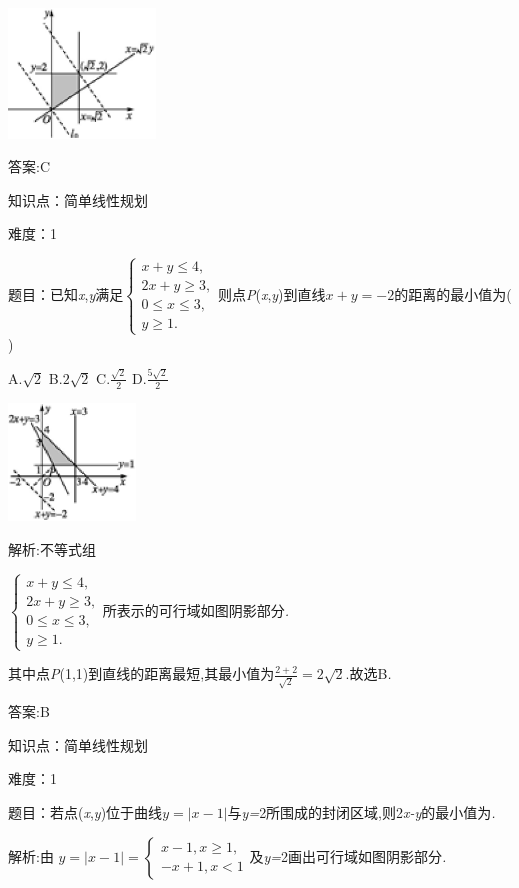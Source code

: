 \documentclass{article} %
\begin{document}
 \includegraphics*[width=1.54in, height=1.36in, keepaspectratio=false]{image1590}

 答案:C

知识点：简单线性规划

难度：1

 题目：已知\textit{x},\textit{y}满足$
\begin{cases}
x+y \le 4,\\
2x + y \ge 3,\\
0 \le x\le 3,\\
y \ge 1.
\end{cases}$则点\textit{P}(\textit{x},\textit{y})到直线$x+y=-2$的距离的最小值为(\textit{　　})

 A.$\sqrt{2}$ B.$2\sqrt{2}$ C.$\frac{\sqrt{2}}{2}$ D.$\frac{5\sqrt{2}}{2}$

 \includegraphics*[width=1.33in, height=1.24in, keepaspectratio=false]{image1596}

 解析:不等式组

 $
\begin{cases}
x+y \le 4,\\
2x+y \ge 3,\\
0 \le x \le 3,\\
y \ge 1.
\end{cases}$所表示的可行域如图阴影部分\textit{.}

其中点\textit{P}(1,1)到直线的距离最短,其最小值为$\frac{2+2}{\sqrt{2}}=2\sqrt{2}$.故选B\textit{.}

 答案:B

知识点：简单线性规划

难度：1

 题目：若点(\textit{x},\textit{y})位于曲线$y=|x-1|$与\textit{y=}2所围成的封闭区域,则2\textit{x-y}的最小值为\textit{\underbar{　　　　　}.~}

 解析:由
$
y=|x-1|=
\begin{cases}
x-1,x\ge 1,\\
-x + 1, x<1
\end{cases}$及\textit{y=}2画出可行域如图阴影部分\textit{.}
\end{document}
